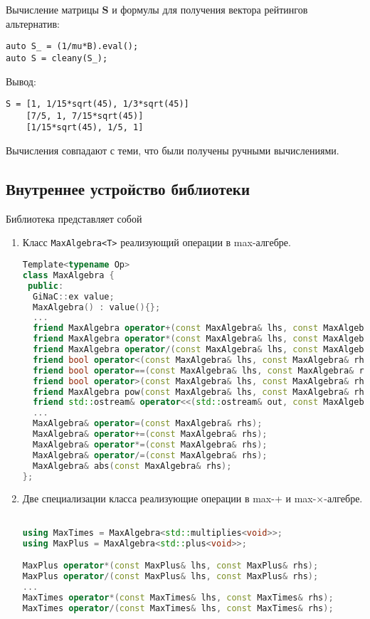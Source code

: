 \documentclass[specialist,
	substylefile = spbu_report.rtx,
	subf,href,colorlinks=true, 12pt]{disser}
\begin{document}
Вычисление матрицы $\boldsymbol{S}$ и формулы для получения вектора рейтингов альтернатив:
\begin{verbatim}
auto S_ = (1/mu*B).eval();
auto S = cleany(S_);
\end{verbatim}
Вывод:
\begin{verbatim}
S = [1, 1/15*sqrt(45), 1/3*sqrt(45)]
	[7/5, 1, 7/15*sqrt(45)]
	[1/15*sqrt(45), 1/5, 1]

\end{verbatim}

Вычисления совпадают с теми, что были получены ручными вычислениями.

\subsection{Внутреннее устройство библиотеки}
Библиотека представляет собой
\begin{enumerate}
	\item Класс \texttt{MaxAlgebra<T>} реализующий операции в max-алгебре.

\begin{lstlisting}[language=C++,basicstyle=\footnotesize\ttfamily,keywordstyle=\color{blue}]
Template<typename Op>
class MaxAlgebra {
 public:
  GiNaC::ex value;
  MaxAlgebra() : value(){};
  ...
  friend MaxAlgebra operator+(const MaxAlgebra& lhs, const MaxAlgebra& rhs);
  friend MaxAlgebra operator*(const MaxAlgebra& lhs, const MaxAlgebra& rhs);
  friend MaxAlgebra operator/(const MaxAlgebra& lhs, const MaxAlgebra& rhs);
  friend bool operator<(const MaxAlgebra& lhs, const MaxAlgebra& rhs);
  friend bool operator==(const MaxAlgebra& lhs, const MaxAlgebra& rhs);
  friend bool operator>(const MaxAlgebra& lhs, const MaxAlgebra& rhs);
  friend MaxAlgebra pow(const MaxAlgebra& lhs, const MaxAlgebra& rhs);
  friend std::ostream& operator<<(std::ostream& out, const MaxAlgebra& val);
  ...
  MaxAlgebra& operator=(const MaxAlgebra& rhs);
  MaxAlgebra& operator+=(const MaxAlgebra& rhs);
  MaxAlgebra& operator*=(const MaxAlgebra& rhs);
  MaxAlgebra& operator/=(const MaxAlgebra& rhs);
  MaxAlgebra& abs(const MaxAlgebra& rhs);
};
\end{lstlisting}
\end{enumerate}

\begin{enumerate}
 \setcounter{enumi}{1}
	\item Две специализации класса реализующие операции в max-+ и max-$\times$-алгебре.
\begin{lstlisting}[language=C++,basicstyle=\footnotesize\ttfamily,keywordstyle=\color{blue}]

using MaxTimes = MaxAlgebra<std::multiplies<void>>;
using MaxPlus = MaxAlgebra<std::plus<void>>;

MaxPlus operator*(const MaxPlus& lhs, const MaxPlus& rhs);
MaxPlus operator/(const MaxPlus& lhs, const MaxPlus& rhs);
...
MaxTimes operator*(const MaxTimes& lhs, const MaxTimes& rhs);
MaxTimes operator/(const MaxTimes& lhs, const MaxTimes& rhs);
\end{lstlisting}
\end{enumerate}
\end{document}
